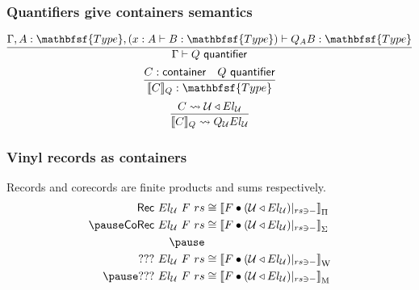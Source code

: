 \documentclass[tikz, 12pt]{beamer}
\def\Type{\mathbfsf{Type}}
\begin{document}
\begin{frame}
  \frametitle{Quantifiers give containers semantics}
  \[
    \infer{\Gamma\vdash Q\ \mathsf{quantifier}}{
      \Gamma,A:\Type, (x:A\vdash B:\Type) \vdash Q_AB:\Type
    }
  \]\pause
  \[
    \infer{\llbracket C\rrbracket_Q : \Type}{
      C : \container &
      Q\ \mathsf{quantifier}
    }
  \]\pause
  \[
    \infer{
      \llbracket C\rrbracket_Q \leadsto Q_\mathcal{U} El_\mathcal{U}
    }{
      C \leadsto \mkcon{\mathcal{U}}{El_\mathcal{U}}
    }
  \]
\end{frame}

\begin{frame}
  \frametitle{Vinyl records as containers}\pause
  Records and corecords are finite products and sums respectively.\pause
  \[
    \begin{aligned}
      \mathsf{Rec}\ El_\mathcal{U}\ F\ rs
      &\cong \left\llbracket F\bullet (\mkcon{\mathcal{U}}{El_\mathcal{U}})|_{rs\ni-}\right\rrbracket_\Pi\\ \pause
      \mathsf{CoRec}\ El_\mathcal{U}\ F\ rs
        &\cong \left\llbracket F\bullet(\mkcon{\mathcal{U}}{El_\mathcal{U}})|_{rs\ni-}\right\rrbracket_\Sigma\\ \pause
      \\
      ???\ El_\mathcal{U}\ F\ rs
        &\cong \left\llbracket F\bullet(\mkcon{\mathcal{U}}{El_\mathcal{U}})|_{rs\ni-} \right\rrbracket_\mathrm{W}\\ \pause
      ???\ El_\mathcal{U}\ F\ rs
        &\cong \left\llbracket F\bullet(\mkcon{\mathcal{U}}{El_\mathcal{U}})|_{rs\ni-}\right\rrbracket_\mathrm{M}
    \end{aligned}
  \]
\end{frame}
\end{document}
